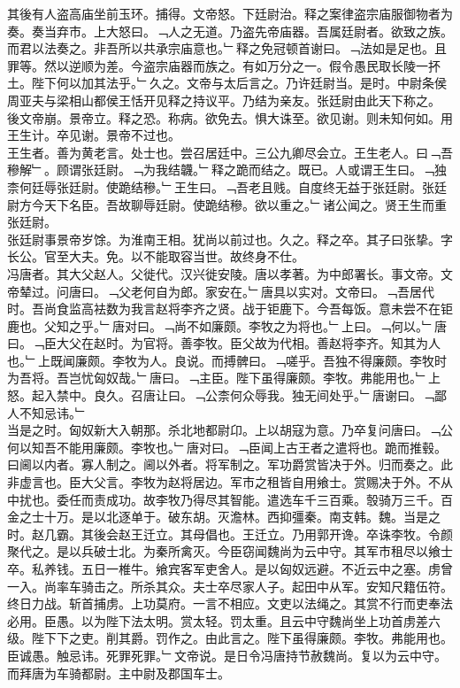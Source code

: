 \documentclass{zhvt-classic}
\begin{document}
\hspace*{2em}其後有人盗高庙坐前玉环。捕得。文帝怒。下廷尉治。释之案律盗宗庙服御物者为奏。奏当弃市。上大怒曰。﹁人之无道。乃盗先帝庙器。吾属廷尉者。欲致之族。而君以法奏之。非吾所以共承宗庙意也。﹂释之免冠顿首谢曰。﹁法如是足也。且罪等。然以逆顺为差。今盗宗庙器而族之。有如万分之一。假令愚民取长陵一抔土。陛下何以加其法乎。﹂久之。文帝与太后言之。乃许廷尉当。是时。中尉条侯周亚夫与梁相山都侯王恬开见释之持议平。乃结为亲友。张廷尉由此天下称之。\\
\hspace*{2em}後文帝崩。景帝立。释之恐。称病。欲免去。惧大诛至。欲见谢。则未知何如。用王生计。卒见谢。景帝不过也。\\
\hspace*{2em}王生者。善为黄老言。处士也。尝召居廷中。三公九卿尽会立。王生老人。曰﹁吾穇解﹂。顾谓张廷尉。﹁为我结韤。﹂释之跪而结之。既已。人或谓王生曰。﹁独柰何廷辱张廷尉。使跪结穇。﹂王生曰。﹁吾老且贱。自度终无益于张廷尉。张廷尉方今天下名臣。吾故聊辱廷尉。使跪结穇。欲以重之。﹂诸公闻之。贤王生而重张廷尉。\\
\hspace*{2em}张廷尉事景帝岁馀。为淮南王相。犹尚以前过也。久之。释之卒。其子曰张挚。字长公。官至大夫。免。以不能取容当世。故终身不仕。\\
\hspace*{2em}冯唐者。其大父赵人。父徙代。汉兴徙安陵。唐以孝著。为中郎署长。事文帝。文帝辇过。问唐曰。﹁父老何自为郎。家安在。﹂唐具以实对。文帝曰。﹁吾居代时。吾尚食监高袪数为我言赵将李齐之贤。战于钜鹿下。今吾每饭。意未尝不在钜鹿也。父知之乎。﹂唐对曰。﹁尚不如廉颇。李牧之为将也。﹂上曰。﹁何以。﹂唐曰。﹁臣大父在赵时。为官将。善李牧。臣父故为代相。善赵将李齐。知其为人也。﹂上既闻廉颇。李牧为人。良说。而搏髀曰。﹁嗟乎。吾独不得廉颇。李牧时为吾将。吾岂忧匈奴哉。﹂唐曰。﹁主臣。陛下虽得廉颇。李牧。弗能用也。﹂上怒。起入禁中。良久。召唐让曰。﹁公柰何众辱我。独无间处乎。﹂唐谢曰。﹁鄙人不知忌讳。﹂\\
\hspace*{2em}当是之时。匈奴新大入朝那。杀北地都尉卬。上以胡寇为意。乃卒复问唐曰。﹁公何以知吾不能用廉颇。李牧也。﹂唐对曰。﹁臣闻上古王者之遣将也。跪而推毂。曰阃以内者。寡人制之。阃以外者。将军制之。军功爵赏皆决于外。归而奏之。此非虚言也。臣大父言。李牧为赵将居边。军市之租皆自用飨士。赏赐决于外。不从中扰也。委任而责成功。故李牧乃得尽其智能。遣选车千三百乘。彀骑万三千。百金之士十万。是以北逐单于。破东胡。灭澹林。西抑彊秦。南支韩。魏。当是之时。赵几霸。其後会赵王迁立。其母倡也。王迁立。乃用郭开谗。卒诛李牧。令颜聚代之。是以兵破士北。为秦所禽灭。今臣窃闻魏尚为云中守。其军市租尽以飨士卒。私养钱。五日一椎牛。飨宾客军吏舍人。是以匈奴远避。不近云中之塞。虏曾一入。尚率车骑击之。所杀其众。夫士卒尽家人子。起田中从军。安知尺籍伍符。终日力战。斩首捕虏。上功莫府。一言不相应。文吏以法绳之。其赏不行而吏奉法必用。臣愚。以为陛下法太明。赏太轻。罚太重。且云中守魏尚坐上功首虏差六级。陛下下之吏。削其爵。罚作之。由此言之。陛下虽得廉颇。李牧。弗能用也。臣诚愚。触忌讳。死罪死罪。﹂文帝说。是日令冯唐持节赦魏尚。复以为云中守。而拜唐为车骑都尉。主中尉及郡国车士。\\
\end{document}

